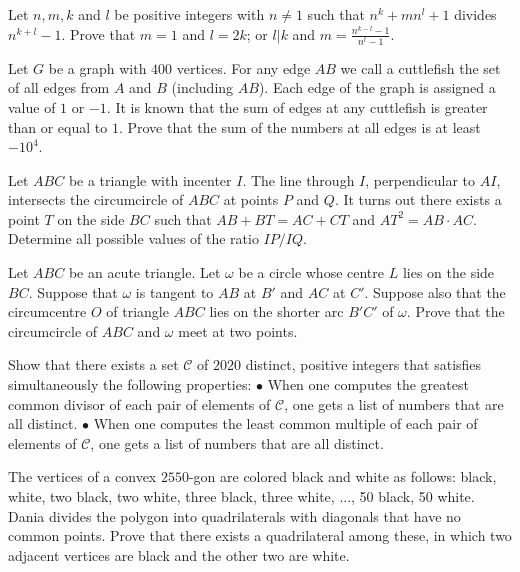 \documentclass[11pt]{scrartcl}
\begin{document}
\begin{problem}[5341232263014748696]
Let $n, m, k$ and $l$ be positive integers with $n \neq 1$ such that $n^k + mn^l + 1$ divides $n^{k+l} - 1$. Prove that
$m = 1$ and $l = 2k$; or
$l|k$ and $m = \frac{n^{k-l}-1}{n^l-1}$.
\end{problem}
\begin{problem}[5347245479409093202]
Let $G$ be a graph with $400$ vertices. For any edge $AB$ we call a cuttlefish the set of all edges from $A$ and $B$ (including $AB$). Each edge of the graph is assigned a value of $1$ or $-1$. It is known that the sum of edges at any cuttlefish is greater than or equal to $1$.
Prove that the sum of the numbers at all edges is at least $-10^4$.
\end{problem}
\begin{problem}[5363953658134647103]
Let $ABC$ be a triangle with incenter $I$. The line through $I$, perpendicular to $AI$, intersects the circumcircle of $ABC$ at points $P$ and $Q$. It turns out there exists a point $T$ on the side $BC$ such that $AB + BT = AC + CT$ and $AT^2 =  AB \cdot AC$. Determine all possible values of the ratio $IP/IQ$.
\end{problem}
\begin{problem}[5379858391330892049]
Let $ABC$ be an acute triangle. Let $\omega$ be a circle whose centre $L$ lies on the side $BC$. Suppose that $\omega$ is tangent to $AB$ at $B'$ and $AC$ at $C'$. Suppose also that the circumcentre $O$ of triangle $ABC$ lies on the shorter arc $B'C'$ of $\omega$. Prove that the circumcircle of $ABC$ and $\omega$ meet at two points.
\end{problem}
\begin{problem}[5392114638976928066]
	Show that there exists a set $\mathcal{C}$ of $2020$ distinct, positive integers that satisfies simultaneously the following properties:
$\bullet$ When one computes the greatest common divisor of each pair of elements of $\mathcal{C}$, one gets a list of numbers that are all distinct.
$\bullet$ When one computes the least common multiple of each pair of elements of $\mathcal{C}$, one gets a list of numbers that are all distinct.
\end{problem}
\begin{problem}[5395714337110519657]
The vertices of a convex $2550$-gon are colored black and white as follows: black, white, two black, two white, three black, three white, ..., 50 black, 50 white. Dania divides the polygon into quadrilaterals with diagonals that have no common points. Prove that there exists a quadrilateral among these, in which two adjacent vertices are black and the other two are white.
\end{problem}
\end{document}
